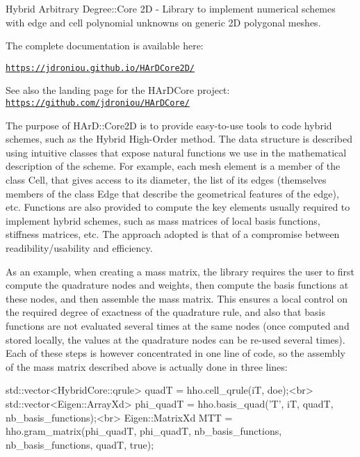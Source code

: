 Hybrid Arbitrary Degree\+::\+Core 2D -\/ Library to implement numerical schemes with edge and cell polynomial unknowns on generic 2D polygonal meshes.

The complete documentation is available here\+:

\href{https://jdroniou.github.io/HArDCore2D/}{\tt https\+://jdroniou.\+github.\+io/\+H\+Ar\+D\+Core2\+D/}

See also the landing page for the H\+Ar\+D\+Core project\+: \href{https://github.com/jdroniou/HArDCore/}{\tt https\+://github.\+com/jdroniou/\+H\+Ar\+D\+Core/}

The purpose of H\+Ar\+D\+::\+Core2D is to provide easy-\/to-\/use tools to code hybrid schemes, such as the Hybrid High-\/\+Order method. The data structure is described using intuitive classes that expose natural functions we use in the mathematical description of the scheme. For example, each mesh element is a member of the class \textquotesingle{}Cell\textquotesingle{}, that gives access to its diameter, the list of its edges (themselves members of the class \textquotesingle{}Edge\textquotesingle{} that describe the geometrical features of the edge), etc. Functions are also provided to compute the key elements usually required to implement hybrid schemes, such as mass matrices of local basis functions, stiffness matrices, etc. The approach adopted is that of a compromise between readibility/usability and efficiency.

As an example, when creating a mass matrix, the library requires the user to first compute the quadrature nodes and weights, then compute the basis functions at these nodes, and then assemble the mass matrix. This ensures a local control on the required degree of exactness of the quadrature rule, and also that basis functions are not evaluated several times at the same nodes (once computed and stored locally, the values at the quadrature nodes can be re-\/used several times). Each of these steps is however concentrated in one line of code, so the assembly of the mass matrix described above is actually done in three lines\+:


\begin{DoxyCode}
std::vector<HybridCore::qrule> quadT = hho.cell\_qrule(iT, doe);<br>
std::vector<Eigen::ArrayXd> phi\_quadT = hho.basis\_quad('T', iT, quadT, nb\_basis\_functions);<br>
Eigen::MatrixXd MTT = hho.gram\_matrix(phi\_quadT, phi\_quadT, nb\_basis\_functions, nb\_basis\_functions, quadT,
       true);
\end{DoxyCode}


